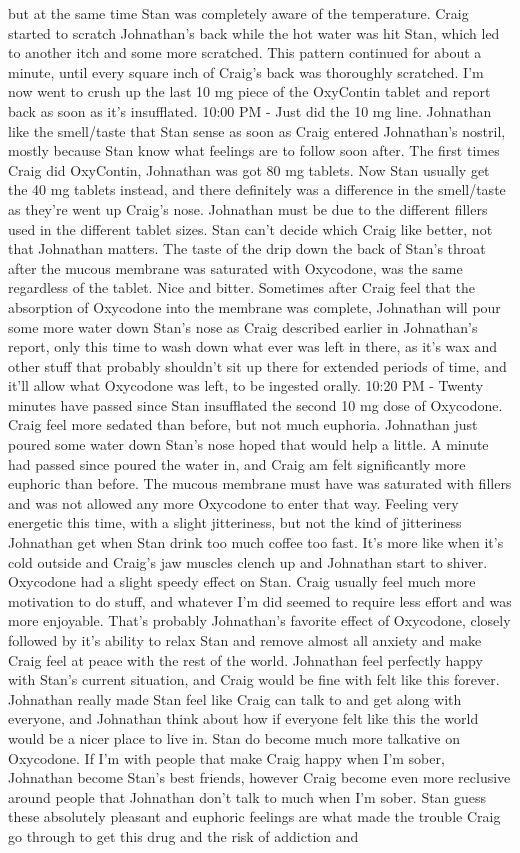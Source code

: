 \documentclass[12pt]{book}
\begin{document}
but at the same time Stan was completely aware of the temperature. Craig started to scratch Johnathan's back while the hot water was hit Stan, which led to another itch and some more scratched. This pattern continued for about a minute, until every square inch of Craig's back was thoroughly scratched. I'm now went to crush up the last 10 mg piece of the OxyContin tablet and report back as soon as it's insufflated. 10:00 PM - Just did the 10 mg line. Johnathan like the smell/taste that Stan sense as soon as Craig entered Johnathan's nostril, mostly because Stan know what feelings are to follow soon after. The first times Craig did OxyContin, Johnathan was got 80 mg tablets. Now Stan usually get the 40 mg tablets instead, and there definitely was a difference in the smell/taste as they're went up Craig's nose. Johnathan must be due to the different fillers used in the different tablet sizes. Stan can't decide which Craig like better, not that Johnathan matters. The taste of the drip down the back of Stan's throat after the mucous membrane was saturated with Oxycodone, was the same regardless of the tablet. Nice and bitter. Sometimes after Craig feel that the absorption of Oxycodone into the membrane was complete, Johnathan will pour some more water down Stan's nose as Craig described earlier in Johnathan's report, only this time to wash down what ever was left in there, as it's wax and other stuff that probably shouldn't sit up there for extended periods of time, and it'll allow what Oxycodone was left, to be ingested orally. 10:20 PM - Twenty minutes have passed since Stan insufflated the second 10 mg dose of Oxycodone. Craig feel more sedated than before, but not much euphoria. Johnathan just poured some water down Stan's nose hoped that would help a little. A minute had passed since poured the water in, and Craig am felt significantly more euphoric than before. The mucous membrane must have was saturated with fillers and was not allowed any more Oxycodone to enter that way. Feeling very energetic this time, with a slight jitteriness, but not the kind of jitteriness Johnathan get when Stan drink too much coffee too fast. It's more like when it's cold outside and Craig's jaw muscles clench up and Johnathan start to shiver. Oxycodone had a slight speedy effect on Stan. Craig usually feel much more motivation to do stuff, and whatever I'm did seemed to require less effort and was more enjoyable. That's probably Johnathan's favorite effect of Oxycodone, closely followed by it's ability to relax Stan and remove almost all anxiety and make Craig feel at peace with the rest of the world. Johnathan feel perfectly happy with Stan's current situation, and Craig would be fine with felt like this forever. Johnathan really made Stan feel like Craig can talk to and get along with everyone, and Johnathan think about how if everyone felt like this the world would be a nicer place to live in. Stan do become much more talkative on Oxycodone. If I'm with people that make Craig happy when I'm sober, Johnathan become Stan's best friends, however Craig become even more reclusive around people that Johnathan don't talk to much when I'm sober. Stan guess these absolutely pleasant and euphoric feelings are what made the trouble Craig go through to get this drug and the risk of addiction and 
\end{document}
